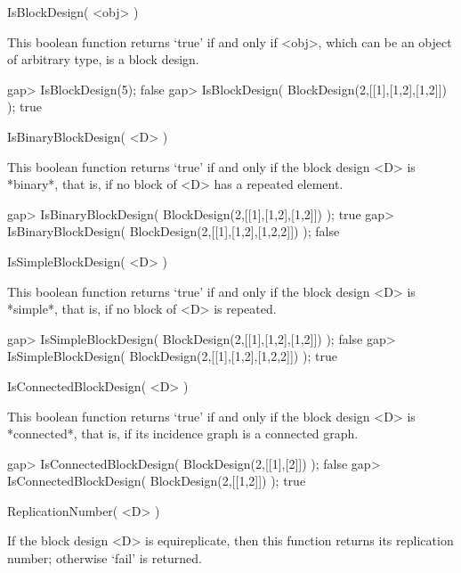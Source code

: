 %
%
%
%
\def\DESIGN{\sf DESIGN}
\def\GRAPE{\sf GRAPE}
\def\nauty{\it nauty}
\def\Aut{{\rm Aut}\,}
\def\x{\times}


\>IsBlockDesign( <obj> )

This boolean function  returns `true' if and only if <obj>, which can be
an object of arbitrary type, is a block design.

\beginexample
gap> IsBlockDesign(5);
false
gap> IsBlockDesign( BlockDesign(2,[[1],[1,2],[1,2]]) );
true
\endexample



\>IsBinaryBlockDesign( <D> )

This boolean function  returns `true' if and only if the block design
<D> is *binary*, that is, if no block of <D> has a repeated element.

\beginexample
gap> IsBinaryBlockDesign( BlockDesign(2,[[1],[1,2],[1,2]]) );
true
gap> IsBinaryBlockDesign( BlockDesign(2,[[1],[1,2],[1,2,2]]) );
false
\endexample



\>IsSimpleBlockDesign( <D> )

This boolean function  returns `true' if and only if the block design
<D> is *simple*, that is, if no block of <D> is repeated.

\beginexample
gap> IsSimpleBlockDesign( BlockDesign(2,[[1],[1,2],[1,2]]) );  
false
gap> IsSimpleBlockDesign( BlockDesign(2,[[1],[1,2],[1,2,2]]) );
true
\endexample



\>IsConnectedBlockDesign( <D> )

This boolean function  returns `true' if and only if the block design
<D> is *connected*, that is, if its incidence graph is a connected
graph.

\beginexample
gap> IsConnectedBlockDesign( BlockDesign(2,[[1],[2]]) ); 
false
gap> IsConnectedBlockDesign( BlockDesign(2,[[1,2]]) );  
true
\endexample



\>ReplicationNumber( <D> )
 
If the block design <D> is equireplicate, then this function returns
its replication number; otherwise `fail' is returned.

